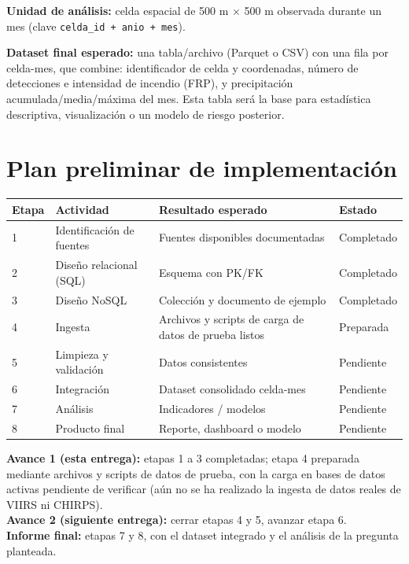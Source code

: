 \documentclass[11pt,a4paper]{article}
\begin{document}
\textbf{Unidad de an\'alisis:} celda espacial de 500 m $\times$ 500 m observada durante un mes (clave \texttt{celda\_id + anio + mes}).

\textbf{Dataset final esperado:} una tabla/archivo (Parquet o CSV) con una fila por celda-mes, que combine: identificador de celda y coordenadas, n\'umero de detecciones e intensidad de incendio (FRP), y precipitaci\'on acumulada/media/m\'axima del mes. Esta tabla ser\'a la base para estad\'istica descriptiva, visualizaci\'on o un modelo de riesgo posterior.

\section{Plan preliminar de implementaci\'on}

\begin{center}
\small
\begin{tabular}{@{}C{1.0cm}L{3.3cm}L{6.0cm}C{2.3cm}@{}}
\toprule
\textbf{Etapa} & \textbf{Actividad} & \textbf{Resultado esperado} & \textbf{Estado} \\
 & Identificaci\'on de fuentes & Fuentes disponibles documentadas & Completado \\
2 & Dise\~no relacional (SQL) & Esquema con PK/FK & Completado \\
3 & Dise\~no NoSQL & Colecci\'on y documento de ejemplo & Completado \\
4 & Ingesta & Archivos y scripts de carga de datos de prueba listos & Preparada \\
5 & Limpieza y validaci\'on & Datos consistentes & Pendiente \\
6 & Integraci\'on & Dataset consolidado celda-mes & Pendiente \\
7 & An\'alisis & Indicadores / modelos & Pendiente \\
8 & Producto final & Reporte, dashboard o modelo & Pendiente \\
\bottomrule
\end{tabular}
\end{center}

\noindent\textbf{Avance 1 (esta entrega):} etapas 1 a 3 completadas; etapa 4 preparada mediante archivos y scripts de datos de prueba, con la carga en bases de datos activas pendiente de verificar (a\'un no se ha realizado la ingesta de datos reales de VIIRS ni CHIRPS).\\
\textbf{Avance 2 (siguiente entrega):} cerrar etapas 4 y 5, avanzar etapa 6.\\
\textbf{Informe final:} etapas 7 y 8, con el dataset integrado y el an\'alisis de la pregunta planteada.
\end{document}
